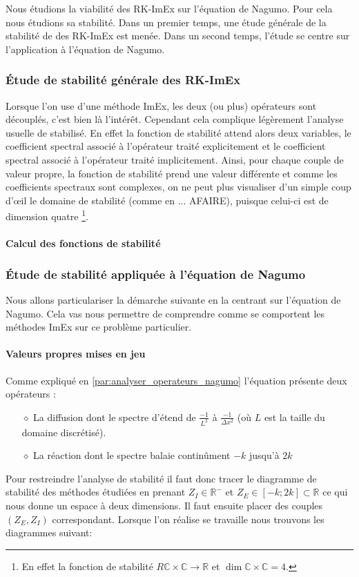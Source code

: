 Nous étudions la viabilité des RK-ImEx sur l'équation de Nagumo. Pour cela nous étudions sa stabilité.
Dans un premier temps, une étude générale de la stabilité de des RK-ImEx est menée.
Dans un second temps, l'étude se centre sur l'application à l'équation de Nagumo.

\subsubsection{Étude de stabilité générale des RK-ImEx}
    Lorsque l'on use d'une méthode ImEx, les deux (ou plus) opérateurs sont découplés, c'est bien là l'intérêt.
    Cependant cela complique légèrement l'analyse usuelle de stabilisé. En effet la fonction de stabilité attend alors deux variables, %
    le coefficient spectral associé à l'opérateur traité explicitement et le coefficient spectral associé à l'opérateur traité implicitement.
    Ainsi, pour chaque couple de valeur propre, la fonction de stabilité prend une valeur différente et comme les coefficients spectraux sont complexes, 
    on ne peut plus visualiser d'un simple coup d'œil le domaine de stabilité (comme en ... AFAIRE), puisque celui-ci est de dimension quatre
    \footnote{En effet la fonction de stabilité $R \mathbb C \times \mathbb C \rightarrow \mathbb R$ et $\dim  \mathbb C \times \mathbb C=4$.}.
    \paragraph{Calcul des fonctions de stabilité}

\subsubsection{Étude de stabilité appliquée à l'équation de Nagumo}
    Nous allons particulariser la démarche suivante en la centrant sur l'équation de Nagumo. Cela vas nous permettre de comprendre 
    comme se comportent les méthodes ImEx sur ce problème particulier.
    \paragraph{Valeurs propres mises en jeu}
        Comme expliqué en \ref{par:analyser_operateurs_nagumo} l'équation présente deux opérateurs : 
        \begin{itemize}
            \item[$\diamond$] La diffusion dont le spectre d'étend de $\frac{-1}{L^2}$ à $\frac{-1}{\Delta x^2}$ (où $L$ est la taille du domaine discrétisé).
            \item[$\diamond$] La réaction dont le spectre balaie continûment $-k$ jusqu'à $2k$
        \end{itemize}
        Pour restreindre l'analyse de stabilité il faut donc tracer le diagramme de stabilité des méthodes étudiées en prenant $Z_I \in \mathbb{R}^-$ 
        et $Z_E \in [-k;2k] \subset \mathbb{R}$ ce qui nous donne un espace à deux dimensions. Il faut ensuite placer des couples $(Z_E,Z_I)$ correspondant.
        Lorsque l'on réalise se travaille nous trouvons les diagrammes suivant: 
